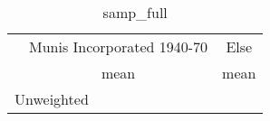 \begin{table}[htbp]\centering
\def\sym#1{\ifmmode^{#1}\else\(^{#1}\)\fi}
\caption{samp\_full \label{tab1}}
\begin{tabular}{l*{2}{c}}
\toprule
                    &\multicolumn{1}{c}{Munis Incorporated 1940-70}&\multicolumn{1}{c}{Else}\\
                    &        mean&        mean\\
\midrule
\bottomrule
\multicolumn{3}{l}{\footnotesize Unweighted}\\
\end{tabular}
\end{table}
